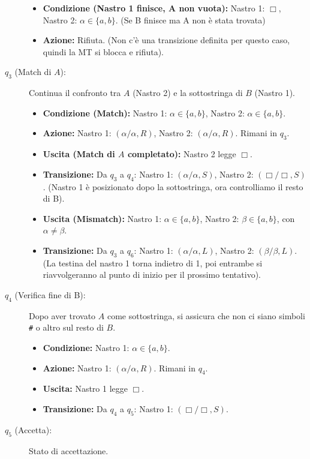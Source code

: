 \documentclass[a4paper, 11pt]{book} %
\theoremstyle{definition}
\begin{document}
\begin{description}
\begin{itemize}
        \item \textbf{Condizione (Nastro 1 finisce, A non vuota):} Nastro 1: $\Box$, Nastro 2: $\alpha \in \{a,b\}$. (Se B finisce ma A non è stata trovata)
        \item \textbf{Azione:} Rifiuta. (Non c'è una transizione definita per questo caso, quindi la MT si blocca e rifiuta).
    \end{itemize}
    \item[$q_3$ (Match di $A$):] Continua il confronto tra $A$ (Nastro 2) e la sottostringa di $B$ (Nastro 1).
    \begin{itemize}
        \item \textbf{Condizione (Match):} Nastro 1: $\alpha \in \{a,b\}$, Nastro 2: $\alpha \in \{a,b\}$.
        \item \textbf{Azione:} Nastro 1: $(\alpha/\alpha, R)$, Nastro 2: $(\alpha/\alpha, R)$. Rimani in $q_3$.
        \item \textbf{Uscita (Match di $A$ completato):} Nastro 2 legge $\Box$.
        \item \textbf{Transizione:} Da $q_3$ a $q_4$: Nastro 1: $(\alpha/\alpha, S)$, Nastro 2: $(\Box/\Box, S)$. (Nastro 1 è posizionato dopo la sottostringa, ora controlliamo il resto di B).
        \item \textbf{Uscita (Mismatch):} Nastro 1: $\alpha \in \{a,b\}$, Nastro 2: $\beta \in \{a,b\}$, con $\alpha \ne \beta$.
        \item \textbf{Transizione:} Da $q_3$ a $q_6$: Nastro 1: $(\alpha/\alpha, L)$, Nastro 2: $(\beta/\beta, L)$. (La testina del nastro 1 torna indietro di 1, poi entrambe si riavvolgeranno al punto di inizio per il prossimo tentativo).
    \end{itemize}
    \item[$q_4$ (Verifica fine di B):] Dopo aver trovato $A$ come sottostringa, si assicura che non ci siano simboli \texttt{\#} o altro sul resto di $B$.
    \begin{itemize}
        \item \textbf{Condizione:} Nastro 1: $\alpha \in \{a,b\}$.
        \item \textbf{Azione:} Nastro 1: $(\alpha/\alpha, R)$. Rimani in $q_4$.
        \item \textbf{Uscita:} Nastro 1 legge $\Box$.
        \item \textbf{Transizione:} Da $q_4$ a $q_5$: Nastro 1: $(\Box/\Box, S)$.
    \end{itemize}
    \item[$q_5$ (Accetta):] Stato di accettazione.

\end{description}
\end{document}
